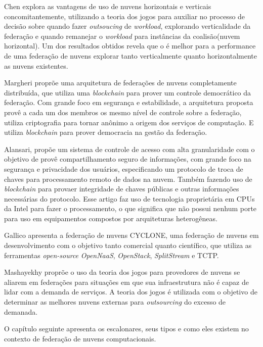 Chen\cite{7835207} explora as vantagens de uso de nuvens horizontais e verticais concomitantemente, utilizando a teoria dos jogos para auxiliar no processo de decisão sobre quando fazer \textit{outsoucing} de \textit{workload}, explorando verticalidade da federação e quando remanejar o \textit{workload} para instâncias da coalisão(nuvem horizontal). Um dos resultados obtidos revela que o é melhor para a performance de uma federação de nuvens explorar tanto verticalmente quanto horizontalmente as nuvens existentes.

Margheri \cite{FaaS_8030651} proprõe uma arquitetura de federações de nuvens completamente distribuída, que utiliza uma \textit{blockchain} para prover um controle democrático da federação. Com grande foco em segurança e estabilidade, a arquitetura proposta provê a cada um dos membros os mesmo nível de controle sobre a federação, utiliza criptografia para tornar anônimo a origem dos serviços de computação. E utiliza \textit{blockchain} para prover democracia na gestão da federação.

Alansari\cite{ACS_Federation_7980160}, propõe um sistema de controle de acesso com alta granularidade com o objetivo de provê compartilhamento seguro de informações, com grande foco na segurança e privacidade dos usuários, especificando um protocolo de troca de chaves para processamento remoto de dados na nuvem. Também fazendo uso de \textit{blockchain} para provaer integridade de chaves públicas e outras informações necessárias do protocolo. Esse artigo faz uso de tecnologia proprietária em \acrshort{CPU}s da Intel para fazer o processamento, o que significa que não possui nenhum porte para uso em equipamentos compostos por arquiteturas heterogêneas.

Gallico\cite{CYCLONE_7776591} apresenta a federação de nuvens CYCLONE, uma federação de nuvens em desenvolvimento com o objetivo tanto comercial quanto científico, que utiliza as ferramentas \textit{open-source} \textit{OpenNaaS}, \textit{OpenStack}, \textit{SplitStream} e \acrfull{TCTP}.

Mashayekhy\cite{6853386} proprõe o uso da teoria dos jogos para provedores de nuvens se aliarem em federações para situações em que sua infraestrutura não é capaz de lidar com a demanda de serviços. A teoria dos jogos é utilizada com o objetivo de determinar as melhores nuvens externas para \textit{outsourcing} do excesso de demanada.

O capítulo seguinte apresenta os escalonares, seus tipos e como eles existem no contexto de federação de nuvens computacionais.

